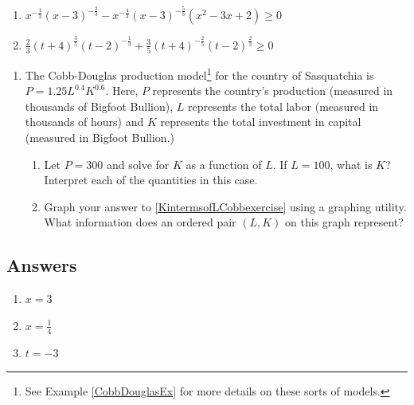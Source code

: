 \begin{enumerate}
\setcounter{enumi}{\value{HW}}


\item $x^{-\frac{1}{3}} (x-3)^{-\frac{2}{3}} - x^{-\frac{4}{3}} (x-3)^{-\frac{5}{3}} (x^2-3x+2) \geq 0$  
\item $\frac{2}{3}(t + 4)^{\frac{3}{5}}(t - 2)^{-\frac{1}{3}} + \frac{3}{5}(t + 4)^{-\frac{2}{5}}(t - 2)^{\frac{2}{3}} \geq 0$ \label{powereqineqexlasta}

\setcounter{HW}{\value{enumi}}
\end{enumerate}




\begin{enumerate}
\setcounter{enumi}{\value{HW}}
\item The Cobb-Douglas production model\footnote{See Example \ref{CobbDouglasEx} for more details on these sorts of models.} for the country of Sasquatchia is $P = 1.25L^{0.4}K^{0.6}$.  Here, $P$ represents the country's production (measured in thousands of Bigfoot  Bullion), $L$ represents the total labor (measured in thousands of hours) and $K$ represents the total investment in capital (measured in Bigfoot Bullion.)

\begin{enumerate}

\item \label{KintermsofLCobbexercise}Let $P = 300$ and solve for $K$ as a function of  $L$.  If $L = 100$, what is $K$?  Interpret each of the quantities in this case.

\item Graph your answer to \ref{KintermsofLCobbexercise} using a graphing utility.  What information does an ordered pair $(L, K)$ on this graph represent?  

\end{enumerate}

\end{enumerate}

\newpage

\subsection{Answers}

\begin{multicols}{3}
\begin{enumerate}


\item $x=3$  
\item  $x = \frac{1}{4}$
\item  $t=-3$  

\setcounter{HW}{\value{enumi}}
\end{enumerate}
\end{multicols}


